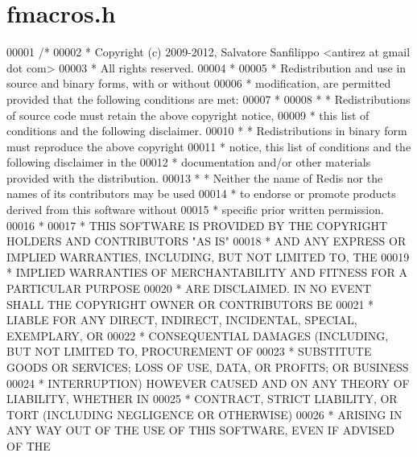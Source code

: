 \hypertarget{fmacros_8h_source}{}\section{fmacros.\+h}
\label{fmacros_8h_source}

\begin{DoxyCode}
00001 \textcolor{comment}{/*}
00002 \textcolor{comment}{ * Copyright (c) 2009-2012, Salvatore Sanfilippo <antirez at gmail dot com>}
00003 \textcolor{comment}{ * All rights reserved.}
00004 \textcolor{comment}{ *}
00005 \textcolor{comment}{ * Redistribution and use in source and binary forms, with or without}
00006 \textcolor{comment}{ * modification, are permitted provided that the following conditions are met:}
00007 \textcolor{comment}{ *}
00008 \textcolor{comment}{ *   * Redistributions of source code must retain the above copyright notice,}
00009 \textcolor{comment}{ *     this list of conditions and the following disclaimer.}
00010 \textcolor{comment}{ *   * Redistributions in binary form must reproduce the above copyright}
00011 \textcolor{comment}{ *     notice, this list of conditions and the following disclaimer in the}
00012 \textcolor{comment}{ *     documentation and/or other materials provided with the distribution.}
00013 \textcolor{comment}{ *   * Neither the name of Redis nor the names of its contributors may be used}
00014 \textcolor{comment}{ *     to endorse or promote products derived from this software without}
00015 \textcolor{comment}{ *     specific prior written permission.}
00016 \textcolor{comment}{ *}
00017 \textcolor{comment}{ * THIS SOFTWARE IS PROVIDED BY THE COPYRIGHT HOLDERS AND CONTRIBUTORS "AS IS"}
00018 \textcolor{comment}{ * AND ANY EXPRESS OR IMPLIED WARRANTIES, INCLUDING, BUT NOT LIMITED TO, THE}
00019 \textcolor{comment}{ * IMPLIED WARRANTIES OF MERCHANTABILITY AND FITNESS FOR A PARTICULAR PURPOSE}
00020 \textcolor{comment}{ * ARE DISCLAIMED. IN NO EVENT SHALL THE COPYRIGHT OWNER OR CONTRIBUTORS BE}
00021 \textcolor{comment}{ * LIABLE FOR ANY DIRECT, INDIRECT, INCIDENTAL, SPECIAL, EXEMPLARY, OR}
00022 \textcolor{comment}{ * CONSEQUENTIAL DAMAGES (INCLUDING, BUT NOT LIMITED TO, PROCUREMENT OF}
00023 \textcolor{comment}{ * SUBSTITUTE GOODS OR SERVICES; LOSS OF USE, DATA, OR PROFITS; OR BUSINESS}
00024 \textcolor{comment}{ * INTERRUPTION) HOWEVER CAUSED AND ON ANY THEORY OF LIABILITY, WHETHER IN}
00025 \textcolor{comment}{ * CONTRACT, STRICT LIABILITY, OR TORT (INCLUDING NEGLIGENCE OR OTHERWISE)}
00026 \textcolor{comment}{ * ARISING IN ANY WAY OUT OF THE USE OF THIS SOFTWARE, EVEN IF ADVISED OF THE}

\end{DoxyCode}
